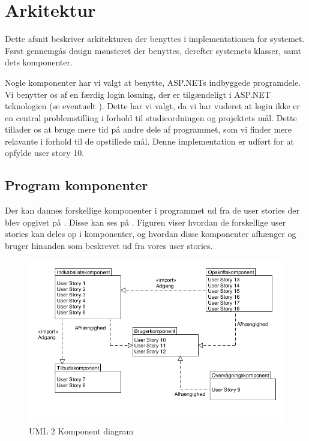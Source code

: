 \section{Arkitektur}
Dette afsnit beskriver arkitekturen der benyttes i implementationen for systemet.
Først gennemgås design mønsteret der benyttes, derefter systemets klasser, samt dets komponenter.

Nogle komponenter har vi valgt at benytte, ASP.NETs indbyggede programdele.
Vi benytter os af en færdig login løsning, der er tilgændeligt i ASP.NET teknologien (se eventuelt ).
Dette har vi valgt, da vi har vuderet at login ikke er en central problemstilling i forhold til studieordningen og projektets mål.
Dette tillader os at bruge mere tid på andre dele af programmet, som vi finder mere relavante i forhold til de opstillede mål.
Denne implementation er udført for at opfylde user story 10.



\subsection{Program komponenter}\label{subsec:komp}

Der kan dannes forskellige komponenter i programmet ud fra de user stories der blev opgivet på .
Disse kan ses på .
Figuren viser hvordan de forskellige user stories kan deles op i komponenter, og hvordan disse komponenter afhænger og bruger hinanden som beskrevet ud fra vores user stories.

\begin{figure}
	\vspace{-20pt}
	\begin{center}
		\includegraphics[scale=0.6]{images/Diagrams/Komponenter.png}
	\end{center}
	\vspace{-20pt}
	\caption{UML 2 Komponent diagram }
	\label{figure:komp}
	\vspace{-20pt}
\end{figure}

